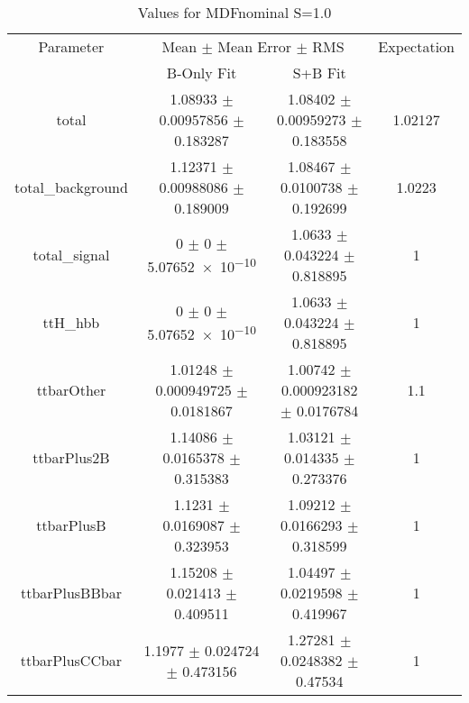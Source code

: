 \begin{table}
\centering
\caption{Values for MDFnominal S=1.0}
\begin{tabular}{cccc}
\toprule
Parameter & \multicolumn{2}{c}{Mean $\pm$ Mean Error $\pm$ RMS} & Expectation\\
 & B-Only Fit & S+B Fit & \\
\midrule
total & \num{1.08933} $\pm$ \num{0.00957856} $\pm$ \num{0.183287} & \num{1.08402} $\pm$ \num{0.00959273} $\pm$ \num{0.183558} & \num{1.02127}\\
total\_background & \num{1.12371} $\pm$ \num{0.00988086} $\pm$ \num{0.189009} & \num{1.08467} $\pm$ \num{0.0100738} $\pm$ \num{0.192699} & \num{1.0223}\\
total\_signal & \num{0} $\pm$ \num{0} $\pm$ \num{5.07652e-10} & \num{1.0633} $\pm$ \num{0.043224} $\pm$ \num{0.818895} & \num{1}\\
ttH\_hbb & \num{0} $\pm$ \num{0} $\pm$ \num{5.07652e-10} & \num{1.0633} $\pm$ \num{0.043224} $\pm$ \num{0.818895} & \num{1}\\
ttbarOther & \num{1.01248} $\pm$ \num{0.000949725} $\pm$ \num{0.0181867} & \num{1.00742} $\pm$ \num{0.000923182} $\pm$ \num{0.0176784} & \num{1.1}\\
ttbarPlus2B & \num{1.14086} $\pm$ \num{0.0165378} $\pm$ \num{0.315383} & \num{1.03121} $\pm$ \num{0.014335} $\pm$ \num{0.273376} & \num{1}\\
ttbarPlusB & \num{1.1231} $\pm$ \num{0.0169087} $\pm$ \num{0.323953} & \num{1.09212} $\pm$ \num{0.0166293} $\pm$ \num{0.318599} & \num{1}\\
ttbarPlusBBbar & \num{1.15208} $\pm$ \num{0.021413} $\pm$ \num{0.409511} & \num{1.04497} $\pm$ \num{0.0219598} $\pm$ \num{0.419967} & \num{1}\\
ttbarPlusCCbar & \num{1.1977} $\pm$ \num{0.024724} $\pm$ \num{0.473156} & \num{1.27281} $\pm$ \num{0.0248382} $\pm$ \num{0.47534} & \num{1}\\
\bottomrule
\end{tabular}
\end{table}